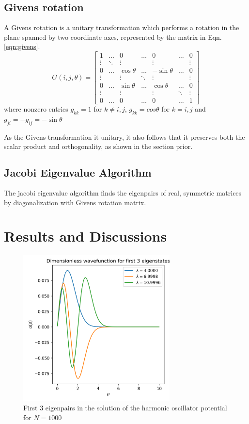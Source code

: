 \documentclass[10pt,showpacs,preprintnumbers,footinbib,amsmath,amssymb,aps,prl,twocolumn,groupedaddress,superscriptaddress,showkeys]{revtex4-1}
\begin{document}
\subsection{Givens rotation}
  A Givens rotation is a unitary transformation which performs a rotation in the plane spanned by two coordinate axes, represented by the matrix in Eqn. \ref{eqn:givens}.
  \begin{equation}
    \label{eqn:givens}
    G(i, j, \theta) = 
    \begin{bmatrix}
      1 & \dots & 0 & \dots & 0 & \dots & 0 \\
      \vdots & \ddots & \vdots & & \vdots & & \vdots \\
      0 &\dots & \cos\theta & \dots  & - \sin \theta & \dots & 0 \\
      \vdots && \vdots & \ddots & \vdots && \vdots \\
      0 & \dots & \sin \theta & \dots & \cos \theta & \dots & 0 \\
      \vdots && \vdots && \vdots & \ddots & \vdots \\
      0 & \dots & 0 & \dots & 0 & \dots & 1
    \end{bmatrix}
  \end{equation}
  where nonzero entries $g_{kk}=1$ for $k\neq i,j$, $g_{kk}=cos\theta$ for $k=i,j$ and $g_{ji} = -g_{ij} = -\sin \theta$ \cite{givens}

  As the Givens transformation it unitary, it also follows that it preserves both the scalar product and orthogonality, as shown in the section prior.

\subsection{Jacobi Eigenvalue Algorithm \label{subsec:jacobi_algo}}
    The jacobi eigenvalue algorithm finds the eigenpairs of real, symmetric matrices by diagonalization with Givens rotation matrix.

\section{Results and Discussions}
  \begin{figure}[h!]
    \center
    \includegraphics[width=8cm]{figs/question2d.png}
    \caption{First 3 eigenpairs in the solution of the harmonic oscillator potential for $N=1000$}
  \end{figure}
\end{document}
